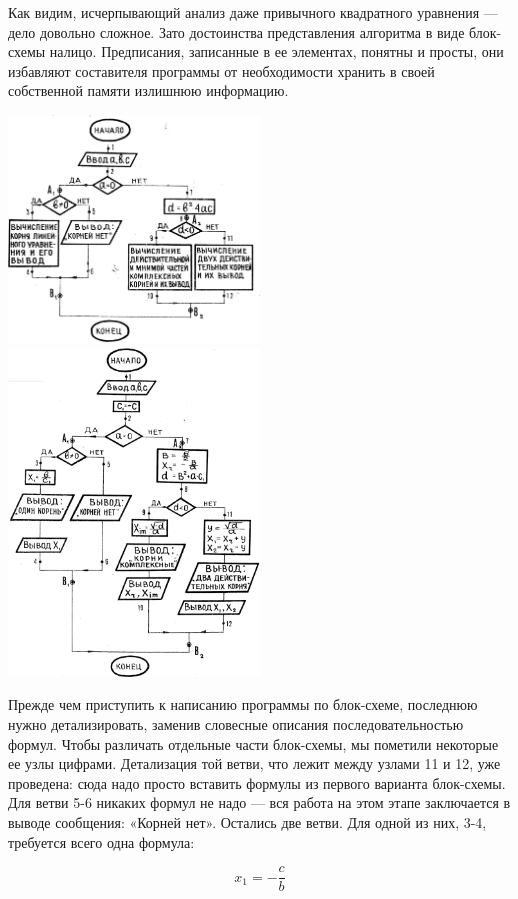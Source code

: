 \documentclass[11pt,a4paper,oneside]{article}
\begin{document}
Как видим, исчерпывающий анализ даже привычного квадратного уравнения — дело довольно сложное. Зато достоинства представления алгоритма в виде блок-схемы налицо. Предписания, записанные в ее элементах, понятны и просты, они избавляют составителя программы от необходимости хранить в своей собственной памяти излишнюю информацию.

\includegraphics[width=0.5\textwidth]{sqroot_algo1}
\includegraphics[width=0.5\textwidth]{sqroot_algo2}

Прежде чем приступить к написанию программы по блок-схеме, последнюю нужно детализировать, заменив словесные описания последовательностью формул. Чтобы различать отдельные части блок-схемы, мы пометили некоторые ее узлы цифрами. Детализация той ветви, что лежит между узлами 11 и 12, уже проведена: сюда надо просто вставить формулы из первого варианта блок-схемы. Для ветви 5-6 никаких формул не надо — вся работа на этом этапе заключается в выводе сообщения: «Корней нет». Остались две ветви. Для одной из них, 3-4, требуется всего одна формула:

\begin{equation}
x_{1}=-\frac{c}{b}
\end{equation}
\end{document}
